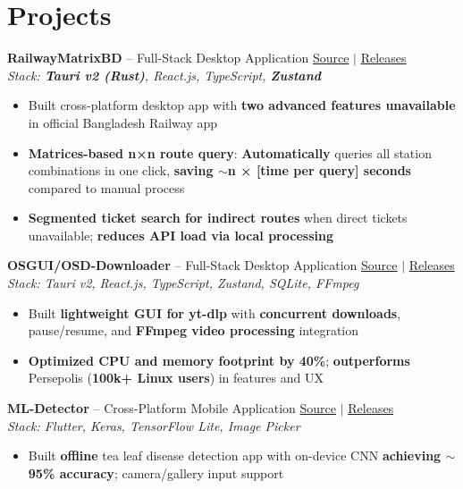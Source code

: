 \documentclass[10pt,a4paper]{article}
\begin{document}
\section{Projects}
\textbf{RailwayMatrixBD} -- Full-Stack Desktop Application \hfill \href{https://github.com/AhmedTrooper/RailwayMatrixBD}{Source} $|$ \href{https://github.com/AhmedTrooper/RailwayMatrixBD/releases}{Releases} \\
\textit{Stack: \textbf{Tauri v2 (Rust)}, React.js, TypeScript, \textbf{Zustand}} \\[-6pt]
\begin{itemize}[leftmargin=12pt, itemsep=0pt, topsep=2pt]
    \item Built cross-platform desktop app with \textbf{two advanced features unavailable} in official Bangladesh Railway app
    \item \textbf{Matrices-based n×n route query}: \textbf{Automatically} queries all station combinations in one click, \textbf{saving $\sim$n × [time per query] seconds} compared to manual process
    \item \textbf{Segmented ticket search for indirect routes} when direct tickets unavailable; \textbf{reduces API load via local processing}
\end{itemize}

\textbf{OSGUI/OSD-Downloader} -- Full-Stack Desktop Application \hfill \href{https://github.com/AhmedTrooper/OSD-Downloader}{Source} $|$ \href{https://github.com/AhmedTrooper/OSD-Downloader/releases}{Releases} \\
\textit{Stack: Tauri v2, React.js, TypeScript, Zustand, SQLite, FFmpeg} \\[-6pt]
\begin{itemize}[leftmargin=12pt, itemsep=0pt, topsep=2pt]
    \item Built \textbf{lightweight GUI for yt-dlp} with \textbf{concurrent downloads}, pause/resume, and \textbf{FFmpeg video processing} integration
    \item \textbf{Optimized CPU and memory footprint by 40\%}; \textbf{outperforms} Persepolis (\textbf{100k+ Linux users}) in features and UX
\end{itemize}

\textbf{ML-Detector} -- Cross-Platform Mobile Application \hfill \href{https://github.com/AhmedTrooper/ML-Detector}{Source} $|$ \href{https://github.com/AhmedTrooper/ML-Detector/releases}{Releases} \\
\textit{Stack: Flutter, Keras, TensorFlow Lite, Image Picker} \\[-6pt]
\begin{itemize}[leftmargin=12pt, itemsep=0pt, topsep=2pt]
    \item Built \textbf{offline} tea leaf disease detection app with on-device CNN \textbf{achieving $\sim$95\% accuracy}; camera/gallery input support
\end{itemize}
\end{document}
